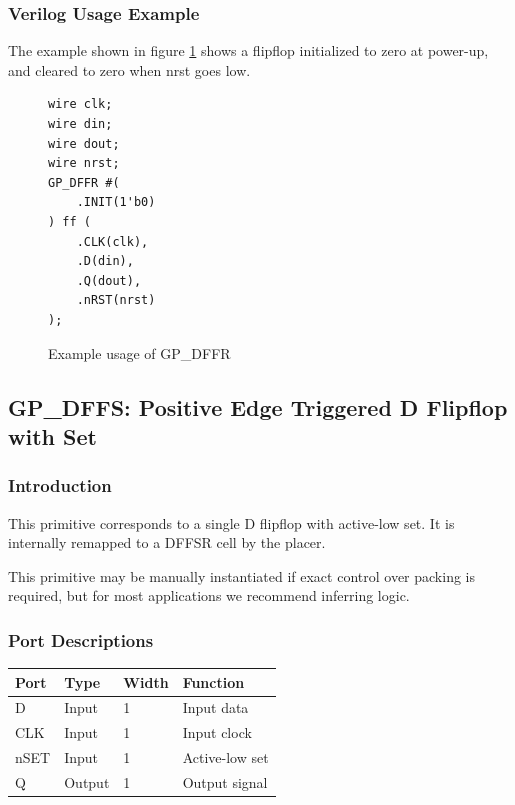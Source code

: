\documentclass{article}
\begin{document}
\subsubsection{Verilog Usage Example}

The example shown in figure \ref{gp-dffr-example} shows a flipflop initialized to zero at power-up, and cleared to zero 
when nrst goes low.

\begin{figure}[h]
\begin{lstlisting}
wire clk;
wire din;
wire dout;
wire nrst;
GP_DFFR #(
	.INIT(1'b0)
) ff (
	.CLK(clk),
	.D(din),
	.Q(dout),
	.nRST(nrst)
);
\end{lstlisting}
\caption{Example usage of GP\_DFFR}
\label{gp-dffr-example}
\end{figure}


\pagebreak
\subsection{GP\_DFFS: Positive Edge Triggered D Flipflop with Set}

\subsubsection{Introduction}
This primitive corresponds to a single D flipflop with active-low set. It is internally remapped to a DFFSR cell by 
the placer.

This primitive may be manually instantiated if exact control over packing is required, but for most applications we 
recommend inferring logic.

\subsubsection{Port Descriptions}

\begin{tabularx}{4in}{|l|l|l|X|}
\hline
{\bfseries Port} & {\bfseries Type} & {\bfseries Width} & {\bfseries Function} \\
\hline
D & Input & 1 & Input data \\
\hline
CLK & Input & 1 & Input clock \\
\hline
nSET & Input & 1 & Active-low set \\
\hline
Q & Output & 1 & Output signal \\
\hline
\end{tabularx}
\end{document}
